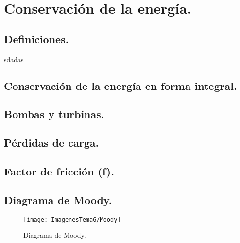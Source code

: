 \chapter{Conservación de la energía.}
\section{Definiciones.}
sdadas
\section{Conservación de la energía en forma integral.}
\section{Bombas y turbinas.}
\section{Pérdidas de carga.}
\section{Factor de fricción (f).}
\section{Diagrama de Moody.}
\begin{figure}[H]
	\centering
	\texttt{[image: ImagenesTema6/Moody]}
	\caption{Diagrama de Moody.}
	\label{fig:moody}
\end{figure}
